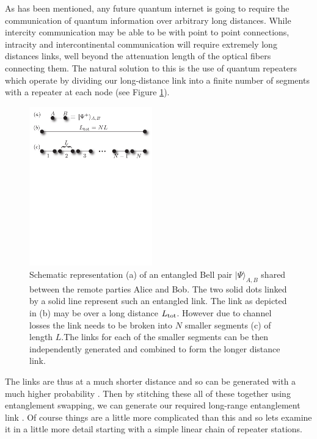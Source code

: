 \documentclass[twocolumn, aps, rmp, amsmath, amssymb, nofootinbib, superscriptaddress, longbibliography, floatfix, table-of-contents, eqsecnum]{revtex4-1}
\begin{document}
\maketitle

As has been mentioned, any future quantum internet \cite{Kimble2008} is going to require the communication of quantum information over arbitrary long distances.  While intercity communication may be able to be with point to point connections, intracity and intercontinental communication will require extremely long distances links, well beyond the attenuation length of the optical fibers connecting them. The natural solution to this is the use of quantum repeaters \cite{Gisin2007,SSRG09,WJM2015} which operate by dividing our long-distance link into a finite number of segments with a repeater at each node (see Figure \ref{fig1}). 
\begin{figure}[!htb]
\begin{center}
\includegraphics[width=0.475\textwidth]{repeaters_1}
\end{center}
\caption{Schematic representation (a) of an entangled Bell pair $| \Psi\rangle_{A,B}$ shared between the remote parties Alice and Bob. The two solid dots linked by a solid line represent such an entangled link.  The link as  depicted in (b) may be over a long distance $L_{\rm tot}$.  However due to channel losses the link needs to be broken into $N$ smaller segments (c) of length $L$.The links for each of the smaller segments can be then independently generated and  combined to form the longer distance link.} 
\label{fig1}
\end{figure} 
The links are thus at a much shorter distance and so can be generated with a much higher probability \cite{}. Then by stitching these all of these together using entanglement swapping, we can generate our required long-range entanglement link \cite{}. Of course things are a little more complicated than this and so lets examine it in a little more detail starting with a simple linear chain of repeater stations. 
\end{document}
